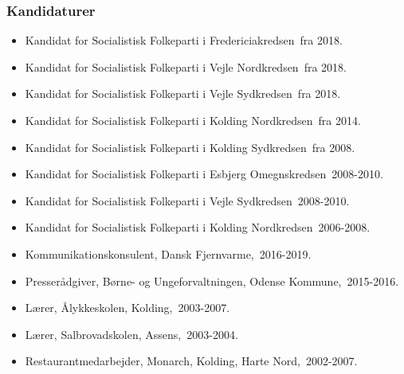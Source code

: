 \documentclass[11pt, a4paper]{awesome-cv}
\begin{document}
\begin{cvletter}
\subsubsection*{Kandidaturer}
\begin{itemize}
\item Kandidat for Socialistisk Folkeparti i Fredericiakredsen fra 2018.
\item Kandidat for Socialistisk Folkeparti i Vejle Nordkredsen fra 2018.
\item Kandidat for Socialistisk Folkeparti i Vejle Sydkredsen fra 2018.
\item Kandidat for Socialistisk Folkeparti i Kolding Nordkredsen fra 2014.
\item Kandidat for Socialistisk Folkeparti i Kolding Sydkredsen fra 2008.
\item Kandidat for Socialistisk Folkeparti i Esbjerg Omegnskredsen 2008-2010.
\item Kandidat for Socialistisk Folkeparti i Vejle Sydkredsen 2008-2010.
\item Kandidat for Socialistisk Folkeparti i Kolding Nordkredsen 2006-2008.
\end{itemize}
\begin{itemize}
\item Kommunikationskonsulent, Dansk Fjernvarme, 2016-2019.
\item Presserådgiver, Børne- og Ungeforvaltningen, Odense Kommune, 2015-2016.
\item Lærer, Ålykkeskolen, Kolding, 2003-2007.
\item Lærer, Salbrovadskolen, Assens, 2003-2004.
\item Restaurantmedarbejder, Monarch, Kolding, Harte Nord, 2002-2007.
\end{itemize}
\end{cvletter}
\end{document}
